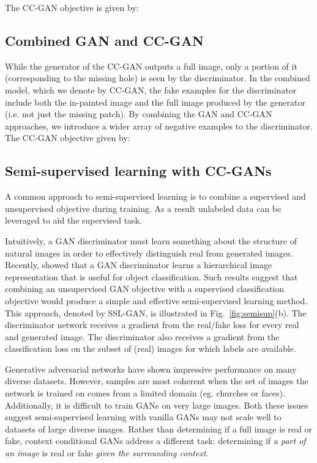 \documentclass{article} \usepackage{iclr2017_conference,times}
\newcommand{\fig}[1]{Fig.~\ref{fig:#1}}
\begin{document}
The CC-GAN objective is given by:




\subsection{Combined GAN and CC-GAN}
While the generator of the CC-GAN outputs a full image, only a portion of it (corresponding to the missing hole) is seen by the discriminator. 
In the combined model, which we denote by CC-GAN, the fake
examples for the discriminator include both the in-painted image  and
the full image  produced by the generator (i.e. not just the missing patch). 
By combining the GAN and CC-GAN approaches, we introduce a wider array of negative examples to the discriminator. The CC-GAN objective given by:



\subsection{Semi-supervised learning with CC-GANs}
A common approach to semi-supervised learning is to combine a supervised and unsupervised objective during training.
As a result unlabeled data can be leveraged to aid the supervised task.

Intuitively, a GAN discriminator must learn something about the structure of natural images in order to effectively distinguish real from generated images. 
Recently, \cite{radford2016} showed that a GAN discriminator learns a hierarchical image representation that is useful for object classification.  
Such results suggest that combining an unsupervised GAN objective with a supervised classification objective would produce a simple and effective semi-supervised learning method. 
This approach, denoted by SSL-GAN, is illustrated in \fig{semisup}(b). The discriminator network receives a gradient from the real/fake loss for every real and generated image.
The discriminator also receives a gradient from the classification loss on the subset of (real) images for which labels are available. 

Generative adversarial networks have shown impressive performance on many diverse datasets. However, samples are most coherent when the set of images the network is trained on comes from a limited domain (eg. churches or faces).
Additionally, it is difficult to train GANs on very large images.
Both these issues suggest semi-supervised learning with vanilla GANs may not scale well to datasets of large diverse images. 
Rather than determining if a full image is real or fake, context conditional GANs address a different task: determining if {\it a part of an image} is real or fake {\it given the surrounding context}.
\end{document}
